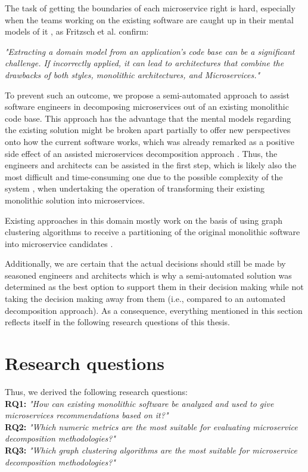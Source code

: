 \documentclass[12pt,a4paper]{report}
\begin{document}
The task of getting the boundaries of each microservice right is hard,
especially when the teams working on the existing software are caught up in
their mental models of it \cite{latoza2006maintaining}, as Fritzsch et al. confirm:
\begin{displayquote}
  \emph{
  "Extracting a domain model from an application's code base can be a significant challenge.
  If incorrectly applied, it can lead to architectures that combine the drawbacks of both styles,
  monolithic architectures, and Microservices."
  }~\cite{fritzsch2018monolith}
\end{displayquote}
To prevent such an outcome, we propose a semi-automated approach
to assist software engineers in decomposing microservices out of an existing
monolithic code base. This approach has the advantage that the mental models
regarding the existing solution might be broken apart partially to offer new
perspectives onto how the current software works, which was already remarked as
a positive side effect of an assisted microservices decomposition approach
\cite{gysel2016service}. Thus, the engineers and architects can be assisted in
the first step, which is likely also the most difficult and time-consuming one
due to the possible complexity of the system \cite{fritzsch2018monolith, france2007model},
when undertaking the operation of transforming their existing
monolithic solution into microservices.

Existing approaches in this domain mostly work on the basis of using graph
clustering algorithms to receive a partitioning of the original monolithic
software into microservice candidates \cite{fritzsch2018monolith}.

Additionally, we are certain that the actual decisions should still be made by
seasoned engineers and architects which is why a semi-automated solution was
determined as the best option to support them in their decision making while
not taking the decision making away from them (i.e., compared to an automated
decomposition approach). As a consequence, everything mentioned in this section
reflects itself in the following research questions of this thesis.



\section{Research questions}

\hangindent=1cm \noindent Thus, we derived the following research questions:\\
\textbf{RQ1:} \textit{"How can existing monolithic software be analyzed and
used to give microservices recommendations based on it?"}\\
\textbf{RQ2:} \textit{"Which numeric metrics are the most suitable for evaluating
microservice decomposition methodologies?"}\\
\textbf{RQ3:} \textit{"Which graph clustering algorithms are the most suitable
for microservice decomposition methodologies?"}
\end{document}
